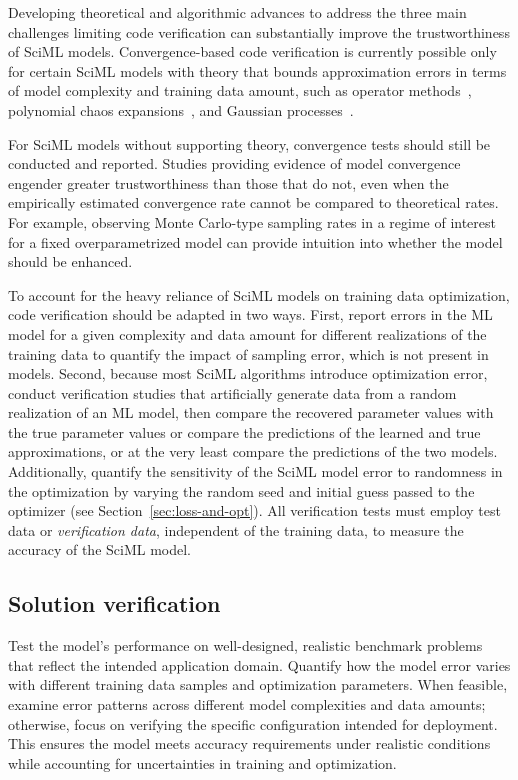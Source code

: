 Developing theoretical and algorithmic advances to address the three main challenges limiting code verification can substantially improve the trustworthiness of SciML models. Convergence-based code verification is currently possible only for certain SciML models with theory that bounds approximation errors in terms of model complexity and training data amount, such as operator methods~\cite{Turnage_et_al_arxiv_2024}, polynomial chaos expansions~\cite{Cohen_M_SMAIJCM_2017,xiu2002wiener}, and Gaussian processes~\cite{Burt_RV_PMLR_2019}.

For SciML models without supporting theory, convergence tests should still be conducted and reported. Studies providing evidence of model convergence engender greater trustworthiness than those that do not, even when the empirically estimated convergence rate cannot be compared to theoretical rates. For example, observing Monte Carlo-type sampling rates in a regime of interest for a fixed overparametrized model can provide intuition into whether the model should be enhanced.

To account for the heavy reliance of SciML models on training data optimization, code verification should be adapted in two ways.
First, report errors in the ML model for a given complexity and data amount for different realizations of the training data to quantify the impact of sampling error, which is not present in \CSE{} models.
Second, because most SciML algorithms introduce optimization error, conduct verification studies that artificially generate data from a random realization of an ML model, then compare the recovered parameter values with the true parameter values or compare the predictions of the learned and true approximations, or at the very least compare the predictions of the two models. Additionally, quantify the sensitivity of the SciML model error to randomness in the optimization by varying the random seed and initial guess passed to the optimizer (see Section~\ref{sec:loss-and-opt}).
All verification tests must employ test data or \emph{verification data}, independent of the training data, to measure the accuracy of the SciML model.


\subsection{Solution verification}

\begin{essrec}
Test the model's performance on well-designed, realistic benchmark problems that reflect the intended application domain. Quantify how the model error varies with different training data samples and optimization parameters. When feasible, examine error patterns across different model complexities and data amounts; otherwise, focus on verifying the specific configuration intended for deployment. This ensures the model meets accuracy requirements under realistic conditions while accounting for uncertainties in training and optimization.
\end{essrec}

